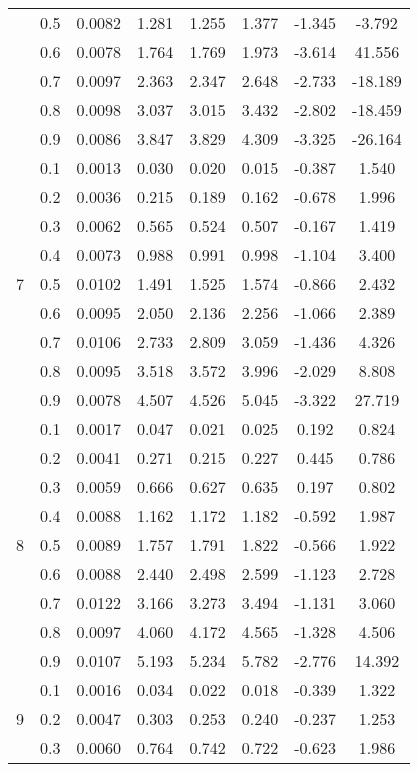 \documentclass[11pt,a4paper]{report}
\begin{document}
\begin{longtable}{ | c | c || c | c | c | c | c | c | }
 & 0.5 & 0.0082 & 1.281 & 1.255 & 1.377 & -1.345 & -3.792 \\
 & 0.6 & 0.0078 & 1.764 & 1.769 & 1.973 & -3.614 & 41.556 \\
 & 0.7 & 0.0097 & 2.363 & 2.347 & 2.648 & -2.733 & -18.189 \\
 & 0.8 & 0.0098 & 3.037 & 3.015 & 3.432 & -2.802 & -18.459 \\
 & 0.9 & 0.0086 & 3.847 & 3.829 & 4.309 & -3.325 & -26.164 \\
 \hline
\multirow{9}{*}{7} & 0.1 & 0.0013 & 0.030 & 0.020 & 0.015 & -0.387 & 1.540 \\
 & 0.2 & 0.0036 & 0.215 & 0.189 & 0.162 & -0.678 & 1.996 \\
 & 0.3 & 0.0062 & 0.565 & 0.524 & 0.507 & -0.167 & 1.419 \\
 & 0.4 & 0.0073 & 0.988 & 0.991 & 0.998 & -1.104 & 3.400 \\
 & 0.5 & 0.0102 & 1.491 & 1.525 & 1.574 & -0.866 & 2.432 \\
 & 0.6 & 0.0095 & 2.050 & 2.136 & 2.256 & -1.066 & 2.389 \\
 & 0.7 & 0.0106 & 2.733 & 2.809 & 3.059 & -1.436 & 4.326 \\
 & 0.8 & 0.0095 & 3.518 & 3.572 & 3.996 & -2.029 & 8.808 \\
 & 0.9 & 0.0078 & 4.507 & 4.526 & 5.045 & -3.322 & 27.719 \\
 \hline
\multirow{9}{*}{8} & 0.1 & 0.0017 & 0.047 & 0.021 & 0.025 & 0.192 & 0.824 \\
 & 0.2 & 0.0041 & 0.271 & 0.215 & 0.227 & 0.445 & 0.786 \\
 & 0.3 & 0.0059 & 0.666 & 0.627 & 0.635 & 0.197 & 0.802 \\
 & 0.4 & 0.0088 & 1.162 & 1.172 & 1.182 & -0.592 & 1.987 \\
 & 0.5 & 0.0089 & 1.757 & 1.791 & 1.822 & -0.566 & 1.922 \\
 & 0.6 & 0.0088 & 2.440 & 2.498 & 2.599 & -1.123 & 2.728 \\
 & 0.7 & 0.0122 & 3.166 & 3.273 & 3.494 & -1.131 & 3.060 \\
 & 0.8 & 0.0097 & 4.060 & 4.172 & 4.565 & -1.328 & 4.506 \\
 & 0.9 & 0.0107 & 5.193 & 5.234 & 5.782 & -2.776 & 14.392 \\
 \hline
\multirow{9}{*}{9} & 0.1 & 0.0016 & 0.034 & 0.022 & 0.018 & -0.339 & 1.322 \\
 & 0.2 & 0.0047 & 0.303 & 0.253 & 0.240 & -0.237 & 1.253 \\
 & 0.3 & 0.0060 & 0.764 & 0.742 & 0.722 & -0.623 & 1.986 \\

\end{longtable}
\end{document}

